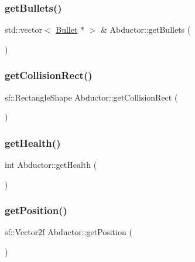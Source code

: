 \subsubsection{\texorpdfstring{get\+Bullets()}{getBullets()}}
{\footnotesize\ttfamily std\+::vector$<$ \hyperlink{class_bullet}{Bullet} $\ast$ $>$ \& Abductor\+::get\+Bullets (\begin{DoxyParamCaption}{ }\end{DoxyParamCaption})}

\mbox{\label{class_abductor_a52e15ddbcabbe719425cdaf98c02b079}} 
\subsubsection{\texorpdfstring{get\+Collision\+Rect()}{getCollisionRect()}}
{\footnotesize\ttfamily sf\+::\+Rectangle\+Shape Abductor\+::get\+Collision\+Rect (\begin{DoxyParamCaption}{ }\end{DoxyParamCaption})}

\mbox{\label{class_abductor_a6893de5e10abe1978bfae651751f2a33}} 
\subsubsection{\texorpdfstring{get\+Health()}{getHealth()}}
{\footnotesize\ttfamily int Abductor\+::get\+Health (\begin{DoxyParamCaption}{ }\end{DoxyParamCaption})}

\mbox{\label{class_abductor_a05b0a89323473488328dafa939e7252a}} 
\subsubsection{\texorpdfstring{get\+Position()}{getPosition()}}
{\footnotesize\ttfamily sf\+::\+Vector2f Abductor\+::get\+Position (\begin{DoxyParamCaption}{ }\end{DoxyParamCaption})}

